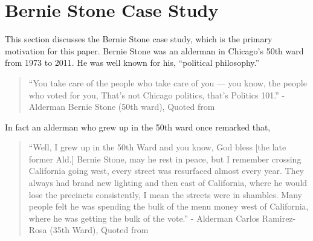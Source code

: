 \section*{Bernie Stone Case Study}
This section discusses the Bernie Stone case study, which is the primary motivation for this paper.
Bernie Stone was an alderman in Chicago's 50th ward from 1973 to 2011.
He was well known for his, ``political philosophy.''

\begin{quotation}
    ``You take care of the people who take care of you — you know, the people who voted for you, That’s not Chicago politics, that’s Politics 101.'' - Alderman Bernie Stone (50th ward), Quoted from~\cite{BGA_berniequote}
\end{quotation}

In fact an alderman who grew up in the 50th ward once remarked that,

\begin{quotation}
    ``Well, I grew up in the 50th Ward and you know, God bless [the late former Ald.] Bernie Stone, may he rest in peace, but I remember crossing California going west, every street was resurfaced almost every year. They always had brand new lighting and then east of California, where he would lose the precincts consistently, I mean the streets were in shambles. Many people felt he was spending the bulk of the menu money west of California, where he was getting the bulk of the vote.'' - Alderman Carlos Ramirez-Rosa (35th Ward), Quoted from~\cite{ramirezrosaquote}
\end{quotation}


